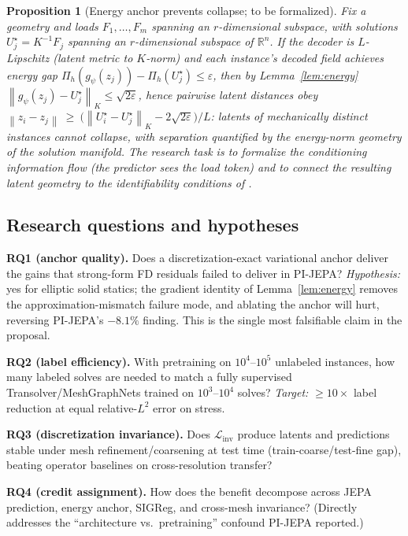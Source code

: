 \documentclass[11pt]{article}
\newtheorem{proposition}{Proposition}
\newcommand{\R}{\mathbb{R}}
\newcommand{\norm}[1]{\left\lVert #1 \right\rVert}
\begin{document}
\begin{proposition}[Energy anchor prevents collapse; to be formalized]
\label{prop:collapse}
Fix a geometry and loads $F_1,\dots,F_m$ spanning an $r$-dimensional
subspace, with solutions $U_j^\star=K^{-1}F_j$ spanning an $r$-dimensional
subspace of $\R^n$. If the decoder is $L$-Lipschitz (latent metric to
$K$-norm) and each instance's decoded field achieves energy gap
$\Pi_h(g_\psi(z_j))-\Pi_h(U_j^\star)\le\varepsilon$, then by
Lemma~\ref{lem:energy} $\norm{g_\psi(z_j)-U^\star_j}_K\le\sqrt{2\varepsilon}$,
hence pairwise latent distances obey
$\norm{z_i-z_j}\ \ge\ \bigl(\norm{U_i^\star-U_j^\star}_K-2\sqrt{2\varepsilon}\bigr)/L$:
latents of mechanically distinct instances cannot collapse, with separation
quantified by the energy-norm geometry of the solution manifold. The research
task is to formalize the conditioning information flow (the predictor sees the
load token) and to connect the resulting latent geometry to the
identifiability conditions of \cite{klindt2026}.
\end{proposition}

\subsection{Research questions and hypotheses}
\label{sec:rq}

\textbf{RQ1 (anchor quality).} Does a discretization-exact variational anchor
deliver the gains that strong-form FD residuals failed to deliver in
PI-JEPA? \emph{Hypothesis:} yes for elliptic solid statics; the gradient
identity of Lemma~\ref{lem:energy} removes the approximation-mismatch failure
mode, and ablating the anchor will hurt, reversing PI-JEPA's $-8.1\%$
finding. This is the single most falsifiable claim in the proposal.

\textbf{RQ2 (label efficiency).} With pretraining on $10^4$--$10^5$ unlabeled
instances, how many labeled solves are needed to match a fully supervised
Transolver/MeshGraphNets trained on $10^3$--$10^4$ solves? \emph{Target:}
$\ge 10\times$ label reduction at equal relative-$L^2$ error on stress.

\textbf{RQ3 (discretization invariance).} Does
$\mathcal{L}_{\mathrm{inv}}$ produce latents and predictions stable under
mesh refinement/coarsening at test time (train-coarse/test-fine gap), beating
operator baselines on cross-resolution transfer?

\textbf{RQ4 (credit assignment).} How does the benefit decompose across
JEPA prediction, energy anchor, SIGReg, and cross-mesh invariance? (Directly
addresses the ``architecture vs.\ pretraining'' confound PI-JEPA reported.)
\end{document}
